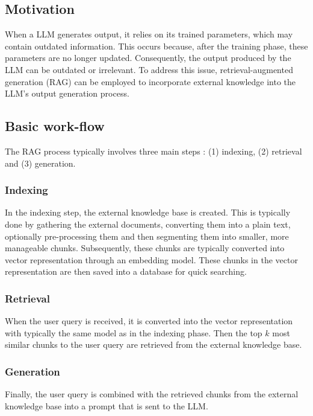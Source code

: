 \subsection{Motivation}

When a LLM generates output, it relies on its trained parameters, which may contain outdated information. This occurs because, after the training phase, these parameters are no longer updated. Consequently, the output produced by the LLM can be outdated or irrelevant. To address this issue, retrieval-augmented generation (RAG) can be employed to incorporate external knowledge into the LLM's output generation process.


\subsection{Basic work-flow}

The RAG process typically involves three main steps \cite{Gao2023}: (1) indexing, (2) retrieval and (3) generation.

\subsubsection{Indexing}

In the indexing step, the external knowledge base is created. This is typically done by gathering the external documents, converting them into a plain text, optionally pre-processing them and then segmenting them into smaller, more manageable chunks. Subsequently, these chunks are typically converted into vector representation through an embedding model. These chunks in the vector representation are then saved into a database for quick searching.


\subsubsection{Retrieval}

When the user query is received, it is converted into the vector representation with typically the same model as in the indexing phase. Then the top $k$ most similar chunks to the user query are retrieved from the external knowledge base.


\subsubsection{Generation}

Finally, the user query is combined with the retrieved chunks from the external knowledge base into a prompt that is sent to the LLM.


